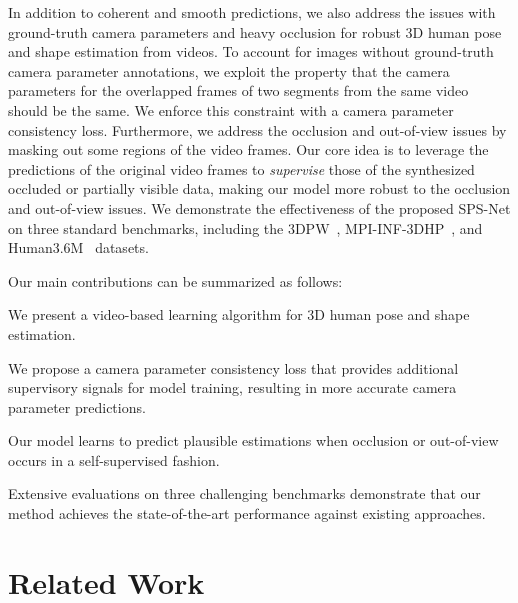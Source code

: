 \documentclass[times,referee,twocolumn,final,authoryear]{elsarticle}
\newcommand{\revised}[1]{{{#1}}}
\begin{document}
\revised{In addition to coherent and smooth predictions, we also address the issues with ground-truth camera parameters and heavy occlusion for robust 3D human pose and shape estimation from videos.}
To account for images without ground-truth camera parameter annotations, we exploit the property that the camera parameters for the overlapped frames of two segments from the same video should be the same. 
We enforce this constraint with a camera parameter consistency loss.
Furthermore, we address the occlusion and out-of-view issues by masking out some regions of the video frames.
Our core idea is to leverage the predictions of the original video frames to \emph{supervise} those of the synthesized occluded or partially visible data, making our model more robust to the occlusion and out-of-view issues.
We demonstrate the effectiveness of the proposed SPS-Net on three standard benchmarks, including the 3DPW~\citep{3DPW}, MPI-INF-3DHP~\citep{MPII}, and Human3.6M~\citep{human36m} datasets.

Our main contributions can be summarized as follows:

\begin{compactitem}
  \item We present a video-based learning algorithm for 3D human pose and shape estimation.
\item We propose a camera parameter consistency loss that provides additional supervisory signals for model training, resulting in more accurate camera parameter predictions.
\item Our model learns to predict plausible estimations when occlusion or out-of-view occurs in a self-supervised fashion.
\item Extensive evaluations on three challenging benchmarks demonstrate that our method achieves the state-of-the-art performance against existing approaches.
\end{compactitem}

\vspace{-3.5mm}
\section{Related Work}
\vspace{-1.5mm}
\end{document}
